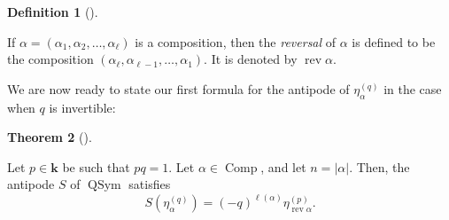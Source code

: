 \documentclass[numbers=enddot,12pt,final,onecolumn,notitlepage]{scrartcl}%
\theoremstyle{definition}
\newtheorem{theo}{Theorem}[section]
\newenvironment{theorem}[1][]
{\begin{theo}[#1]\begin{leftbar}}
{\end{leftbar}\end{theo}}
\newtheorem{defi}[theo]{Definition}
\newenvironment{definition}[1][]
{\begin{defi}[#1]\begin{leftbar}}
{\end{leftbar}\end{defi}}
\begin{document}
\begin{definition}
\label{def.rev}If $\alpha=\left(  \alpha_{1},\alpha_{2},\ldots,\alpha_{\ell
}\right)  $ is a composition, then the \emph{reversal} of $\alpha$ is defined
to be the composition $\left(  \alpha_{\ell},\alpha_{\ell-1},\ldots,\alpha
_{1}\right)  $. It is denoted by $\operatorname*{rev}\alpha$.
\end{definition}

We are now ready to state our first formula for the antipode of $\eta_{\alpha
}^{\left(  q\right)  }$ in the case when $q$ is invertible:

\begin{theorem}
\label{thm.eta.S}Let $p\in\mathbf{k}$ be such that $pq=1$. Let $\alpha
\in\operatorname*{Comp}$, and let $n=\left\vert \alpha\right\vert $. Then, the
antipode $S$ of $\operatorname*{QSym}$ satisfies
\[
S\left(  \eta_{\alpha}^{\left(  q\right)  }\right)  =\left(  -q\right)
^{\ell\left(  \alpha\right)  }\eta_{\operatorname*{rev}\alpha}^{\left(
p\right)  }.
\]

\end{theorem}
\end{document}
